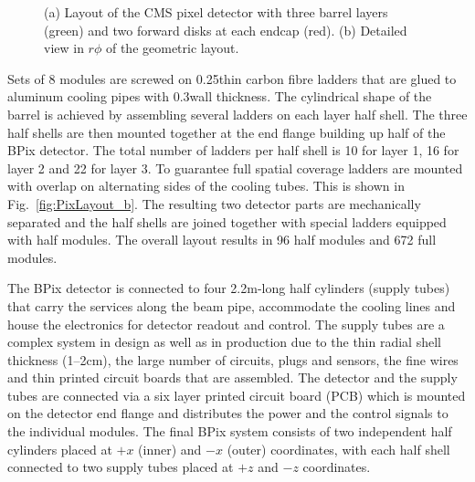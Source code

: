 \begin{figure}[!htb]
 \begin{center}
 \end{center}
 \caption{(a) Layout of the CMS pixel detector with three barrel layers (green) and two forward disks at each endcap (red). (b) Detailed view in $r\phi$ of the geometric layout.}
 \label{fig:PixLayout}
\end{figure}

Sets of 8 modules are screwed on 0.25\mm thin carbon fibre ladders that are glued to aluminum cooling pipes with 0.3\mm wall thickness.
The cylindrical shape of the barrel is achieved by assembling several ladders on each layer half shell.
The three half shells are then mounted together at the end flange building up half of the BPix detector.
The total number of ladders per half shell is 10 for layer 1, 16 for layer 2 and 22 for layer 3.
To guarantee full spatial coverage ladders are mounted with overlap on alternating sides of the cooling tubes. This is shown in Fig.~\ref{fig:PixLayout_b}.
The resulting two detector parts are mechanically separated and the half shells are joined together with special ladders equipped with half modules.
The overall layout results in 96 half modules and 672 full modules.

The BPix detector is connected to four 2.2\unit{m}-long half cylinders (supply tubes) that carry the services along the beam pipe, accommodate the cooling lines and house the electronics for detector readout and control. The supply tubes are a complex system in design as well as in production due to the thin radial shell thickness (1--2\unit{cm}), the large number of circuits, plugs and sensors, the fine wires and thin printed circuit boards that are assembled.
The detector and the supply tubes are connected via a six layer printed circuit board (PCB) which is mounted on the detector end flange and distributes the power and the control signals to the individual modules.
The final BPix system consists of two independent half cylinders placed at $+x$ (inner) and $-x$ (outer) coordinates,
with each half shell connected to two supply tubes placed at $+z$ and $-z$ coordinates.

